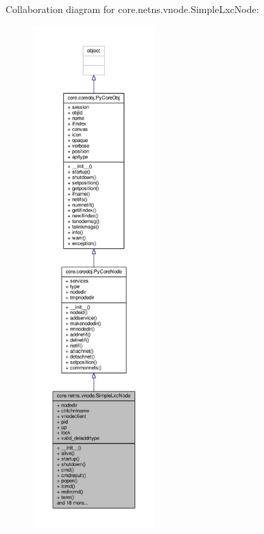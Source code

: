 Collaboration diagram for core.\+netns.\+vnode.\+Simple\+Lxc\+Node\+:
\nopagebreak
\begin{figure}[H]
\begin{center}
\leavevmode
\includegraphics[height=550pt]{classcore_1_1netns_1_1vnode_1_1_simple_lxc_node__coll__graph}
\end{center}
\end{figure}
